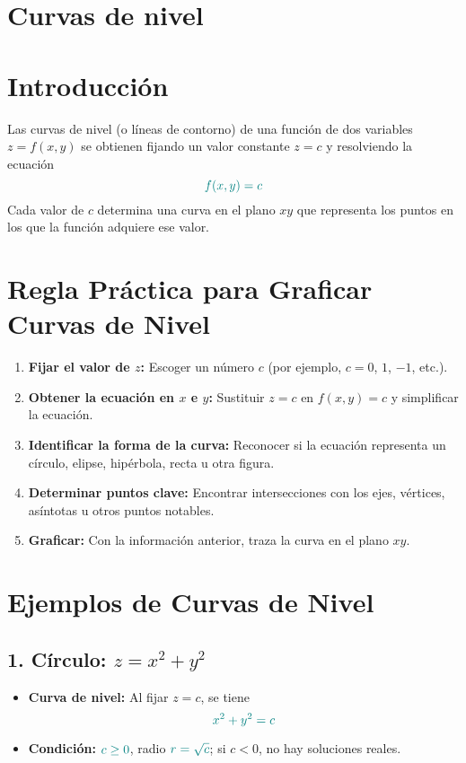 \documentclass{article}
\begin{document}
\printbibliography

\newpage


\section{Curvas de nivel}

\section*{Introducción}
Las curvas de nivel (o líneas de contorno) de una función de dos variables \(z=f(x,y)\) se obtienen fijando un valor constante \(z=c\) y resolviendo la ecuación
\[
\color{teal} f(x,y)=c
\]
Cada valor de \(c\) determina una curva en el plano \(xy\) que representa los puntos en los que la función adquiere ese valor.

\section*{Regla Práctica para Graficar Curvas de Nivel}
\begin{enumerate}[label=\arabic*.]
    \item \textbf{Fijar el valor de \(z\):} Escoger un número \(c\) (por ejemplo, \(c=0\), \(1\), \(-1\), etc.).
    \item \textbf{Obtener la ecuación en \(x\) e \(y\):} Sustituir \(z=c\) en \(f(x,y)=c\) y simplificar la ecuación.
    \item \textbf{Identificar la forma de la curva:} Reconocer si la ecuación representa un círculo, elipse, hipérbola, recta u otra figura.
    \item \textbf{Determinar puntos clave:} Encontrar intersecciones con los ejes, vértices, asíntotas u otros puntos notables.
    \item \textbf{Graficar:} Con la información anterior, traza la curva en el plano \(xy\).
\end{enumerate}

\section*{Ejemplos de Curvas de Nivel}

\subsection*{1. Círculo: \(z=x^2+y^2\)}
\begin{itemize}
    \item \textbf{Curva de nivel:} Al fijar \(z=c\), se tiene \[
    \color{teal} x^2+y^2=c
    \]
    \item \textbf{Condición:} \(\color{teal} c \ge 0\), radio \(\color{teal} r = \sqrt{c}\); si \(c<0\), no hay soluciones reales.
\end{itemize}
\end{document}
